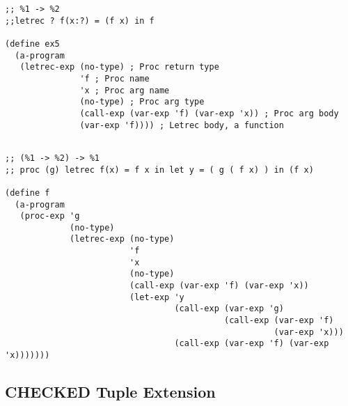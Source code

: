 \documentclass[../main.tex]{subfiles}
\begin{document}
\begin{lstlisting}
;; %1 -> %2
;;letrec ? f(x:?) = (f x) in f

(define ex5
  (a-program
   (letrec-exp (no-type) ; Proc return type
               'f ; Proc name
               'x ; Proc arg name
               (no-type) ; Proc arg type
               (call-exp (var-exp 'f) (var-exp 'x)) ; Proc arg body
               (var-exp 'f)))) ; Letrec body, a function


\end{lstlisting}

\begin{lstlisting}
;; (%1 -> %2) -> %1
;; proc (g) letrec f(x) = f x in let y = ( g ( f x) ) in (f x)

(define f
  (a-program
   (proc-exp 'g
             (no-type)
             (letrec-exp (no-type)
                         'f
                         'x
                         (no-type)
                         (call-exp (var-exp 'f) (var-exp 'x))
                         (let-exp 'y
                                  (call-exp (var-exp 'g)
                                            (call-exp (var-exp 'f)
                                                      (var-exp 'x)))
                                  (call-exp (var-exp 'f) (var-exp 'x)))))))
\end{lstlisting}

\subsection{CHECKED Tuple Extension}
\end{document}

